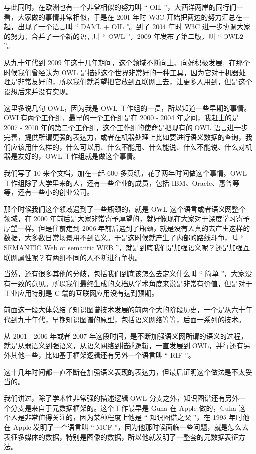 与此同时，在欧洲也有一个非常相似的努力叫 “ OIL ”，大西洋两岸的同行们一看，大家做的事情非常相似，于是在 2001 年时 W3C 开始把两边的努力汇总在一起，出现了一个语言叫 “ DAML + OIL ”。到了 2004 年时 W3C 进一步协调大家的努力，合并了一个新的语言叫 “ OWL ”，2009 年发布了第二版，叫 “ OWL2 ”。

从九十年代到 2009 年这十几年期间，这个领域不断向上、向好积极发展，在那个时候我们曾经认为 OWL 是描述这个世界非常好的一种工具，因为它对于机器处理是非常友好的，所以我们就希望把它放到互联网上去，让更多人用到，但是这个设想后来并没有实现。


这里多说几句 OWL，因为我是 OWL 工作组的一员，所以知道一些早期的事情。OWL有两个工作组，最早的一个工作组是在 2000 - 2004 年之间，我赶上的是 2007 - 2010 年的第二个工作组，这个工作组的使命是把现有的 OWL 语言进一步完善，提供所谓更强的表达力，或者在机器处理上比如要进行语义数据的查询，我们应该用什么样的，什么可以用、什么不能用、什么能说、什么不能说、什么对机器是友好的，OWL 工作组就是做这个事情。

我们写了 10 来个文档，加在一起 600 多页纸，花了两年时间做这个事情。OWL 工作组除了大学里来的人，还有一些企业的成员，包括 IBM、Oracle、惠普等等，还有一些小的创业公司。

那个时候我们这个领域遇到了一些瓶颈的，就是 OWL 这个语言或者语义网整个领域，在 2000 年前后是大家非常寄予厚望的，就好像现在大家对于深度学习寄予厚望一样。但是往前走到 2006 年前后遇到了瓶颈，就是没有人真的去产生这样的数据，大多数日常场景用不到语义。于是这时候就产生了内部的路线斗争，叫 “ SEMANTIC Web or semantic WEB ”，就是到底我们是加强语义呢？还是加强互联网属性呢？有两组不同的人不断进行争执。

当然，还有很多其他的分歧，包括我们到底该怎么去定义什么叫 “ 简单 ”，大家没有一致的意见。所以我们最终生成的文档从学术角度来说是非常有价值，但是对于工业应用特别是 C 端的互联网应用没有达到预期。


前面这一段大体总结了知识图谱技术发展的前两个大的阶段历史，一个是从六十年代到九十年代，早期知识图谱的原型，包括语义网络等等，后面一系列的技术。

从 2001 - 2006 年或者 2007 年这段时间，是不断加强语义网所谓的语义的过程，就是从弱语义到强语义，从语义网络到描述逻辑，一直发展到 OWL，并行还有另外其他一些，比如基于框架逻辑还有另外一个语言叫 “ RIF ”。

这十几年时间都一直不断在加强语义表现的表达力，但最后证明这个做法是不太妥当的。


我们讲过，除了学术性非常强的描述逻辑 OWL 分支之外，知识图谱还有另外一个分支是来自于元数据框架的。这个工作最早是 Guha 在 Apple 做的，Guha 这个人是非常值得关注的，因为某种程度上他是 “ 知识图谱之父 ”，在 1995 年时他在 Apple 发明了一个语言叫 “ MCF ”，因为他那时候面临一些问题，就是怎么去表征多媒体的数据，特别是图像的数据，所以他就发明了一整套的元数据表征方法。

